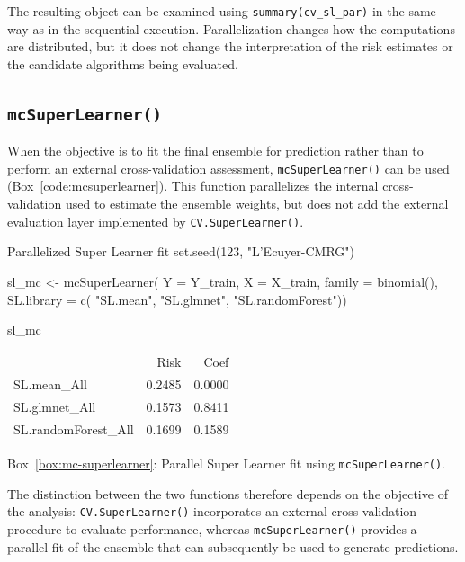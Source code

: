 \documentclass[12pt]{article}
\newcommand{\routputcaption}[2]{%
    \par\smallskip
    \begin{center}
        Box~\ref{#1}: #2
    \end{center}
}
\begin{document}
The resulting object can be examined using \texttt{summary(cv\_sl\_par)} in the same way as in the sequential execution. Parallelization changes how the computations are distributed, but it does not change the interpretation of the risk estimates or the candidate algorithms being evaluated.

\subsection{\texttt{mcSuperLearner()}}

When the objective is to fit the final ensemble for prediction rather than to perform an external cross-validation assessment, \texttt{mcSuperLearner()} can be used (Box~\ref{code:mcsuperlearner}). This function parallelizes the internal cross-validation used to estimate the ensemble weights, but does not add the external evaluation layer implemented by \texttt{CV.SuperLearner()}.

\begin{rcode}[label={code:mcsuperlearner}]{Parallelized Super Learner fit}
	set.seed(123, "L'Ecuyer-CMRG")
	
	sl_mc <- mcSuperLearner(
	Y = Y_train, X = X_train,
	family = binomial(),
	SL.library = c(
	"SL.mean",
	"SL.glmnet",
	"SL.randomForest"))
	
	sl_mc
\end{rcode}

\begin{routputboxref}[label={box:mc-superlearner}]
	\ttfamily
	\centering
	\begin{tabular}{lrr}
		& Risk & Coef \\
		SL.mean\_All         & 0.2485 & 0.0000 \\
		SL.glmnet\_All       & 0.1573 & 0.8411 \\
		SL.randomForest\_All & 0.1699 & 0.1589 \\
	\end{tabular}
\end{routputboxref}

\routputcaption{box:mc-superlearner}
{Parallel Super Learner fit using \texttt{mcSuperLearner()}.}

The distinction between the two functions therefore depends on the objective of the analysis: \texttt{CV.SuperLearner()} incorporates an external cross-validation procedure to evaluate performance, whereas \texttt{mcSuperLearner()} provides a parallel fit of the ensemble that can subsequently be used to generate predictions.
\end{document}

